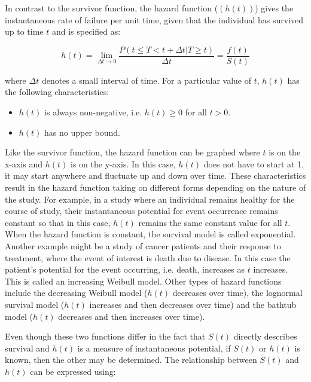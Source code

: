 In contrast to the survivor function, the hazard function ($(h(t))$) gives the instantaneous rate of failure per unit time, given that the individual has survived up to time $t$ and is specified as: 

\begin{equation}
h(t) = \displaystyle{\lim_{\Delta t\to 0} \frac{P(t\leq T < t+\Delta t| T \geq t)}{\Delta t}} = \frac{f(t)}{S(t)}
\label{eq:EQ2}
\end{equation}

where $\Delta t$ denotes a small interval of time. For a particular value of $t$, $h(t)$ has the following characteristics: 

\begin{itemize}
\item $h(t)$ is always non-negative, i.e. $h(t) \geq 0$ for all $t >0$. 

\item $h(t)$ has no upper bound.
\end{itemize}

Like the survivor function, the hazard function can be graphed where $t$ is on the x-axis and $h(t)$ is on the y-axis. In this case, $h(t)$ does not have to start at 1, it may start anywhere and fluctuate up and down over time. These characteristics result in the hazard function taking on different forms depending on the nature of the study. For example, in a study where an individual remains healthy for the course of study, their instantaneous potential for event occurrence remains constant so that in this case, $h(t)$ remains the same constant value for all $t$. When the hazard function is constant, the survival model is called exponential. Another example might be a study of cancer patients and their response to treatment, where the event of interest is death due to disease. In this case the patient's potential for the event occurring, i.e. death, increases as $t$ increases. This is called an increasing Weibull model. Other types of hazard functions include the decreasing Weibull model ($h(t)$ decreases over time), the lognormal survival model ($h(t)$ increases and then decreases over time) and the bathtub model ($h(t)$ decreases and then increases over time).

Even though these two functions differ in the fact that $S(t)$ directly describes survival and $h(t)$ is a measure of instantaneous potential, if $S(t)$ or $h(t)$ is known, then the other may be determined. The relationship between $S(t)$ and $h(t)$ can be expressed using: 


